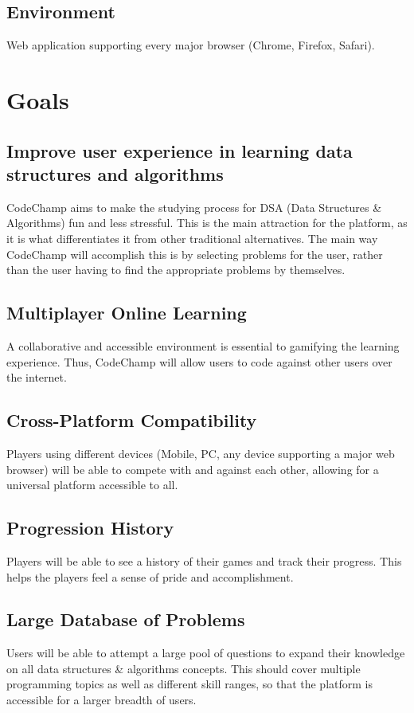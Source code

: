 \documentclass{article}
\begin{document}
\subsection{Environment}

Web application supporting every major browser (Chrome, Firefox, Safari).

\section{Goals}
\subsection{Improve user experience in learning data structures and algorithms}
CodeChamp aims to make the studying process for DSA (Data Structures \& Algorithms) fun and less stressful. This is the main attraction for the platform, as it is what differentiates it from other traditional alternatives. The main way CodeChamp will accomplish this is by selecting problems for the user, rather than the user having to find the appropriate problems by themselves.

\subsection{Multiplayer Online Learning}
A collaborative and accessible environment is essential to gamifying the learning experience. Thus, CodeChamp will allow users to code against other users over the internet.

\subsection{Cross-Platform Compatibility}
Players using different devices (Mobile, PC, any device supporting a major web browser) will be able to compete with and against each other, allowing for a universal platform accessible to all.

\subsection{Progression History}
Players will be able to see a history of their games and track their progress. This helps the players feel a sense of pride and accomplishment.

\subsection{Large Database of Problems}
Users will be able to attempt a large pool of questions to expand their knowledge on all data structures \& algorithms concepts. This should cover multiple programming topics as well as different skill ranges, so that the platform is accessible for a larger breadth of users.
\end{document}
